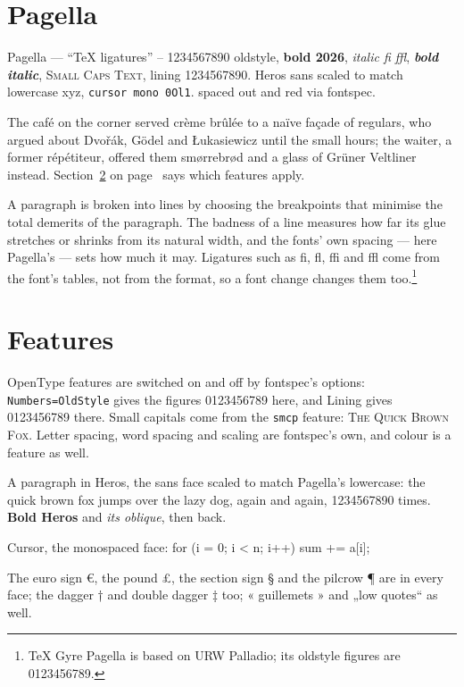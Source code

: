 \documentclass{article}
\begin{document}
\section{Pagella}\label{sec:pagella}
Pagella --- ``TeX ligatures'' -- 1234567890 oldstyle, \textbf{bold 2026}, \textit{italic fi ffl},
\textbf{\textit{bold italic}}, \textsc{Small Caps Text}, {\lining lining 1234567890}.
\textsf{Heros sans scaled to match lowercase xyz}, \texttt{cursor mono 0Ol1}.
{spaced out} and {red via fontspec}.

The café on the corner served crème brûlée to a naïve façade of regulars, who argued
about Dvořák, Gödel and Łukasiewicz until the small hours; the waiter, a former
répétiteur, offered them smørrebrød and a glass of Grüner Veltliner instead.
Section~\ref{sec:features} on page~\pageref{sec:features} says which features apply.

A paragraph is broken into lines by choosing the breakpoints that minimise the total
demerits of the paragraph. The badness of a line measures how far its glue stretches or
shrinks from its natural width, and the fonts' own spacing --- here Pagella's --- sets
how much it may. Ligatures such as fi, fl, ffi and ffl come from the font's tables, not
from the format, so a font change changes them too.\footnote{TeX Gyre Pagella is
based on URW Palladio; its oldstyle figures are 0123456789.}

\section{Features}\label{sec:features}
OpenType features are switched on and off by fontspec's options: \texttt{Numbers=OldStyle}
gives the figures 0123456789 here, {\lining and Lining gives 0123456789 there}. Small
capitals come from the \texttt{smcp} feature: \textsc{The Quick Brown Fox}. Letter
spacing, word spacing and scaling are fontspec's own, and colour is a feature as well.

{\sffamily A paragraph in Heros, the sans face scaled to match Pagella's lowercase: the
quick brown fox jumps over the lazy dog, again and again, 1234567890 times. \textbf{Bold
Heros} and \textit{its oblique}, then back.}

{\ttfamily Cursor, the monospaced face: for (i = 0; i < n; i++) sum += a[i];}

The euro sign €, the pound £, the section sign § and the pilcrow ¶ are in every face;
the dagger † and double dagger ‡ too; « guillemets » and „low quotes“ as well.
\end{document}

